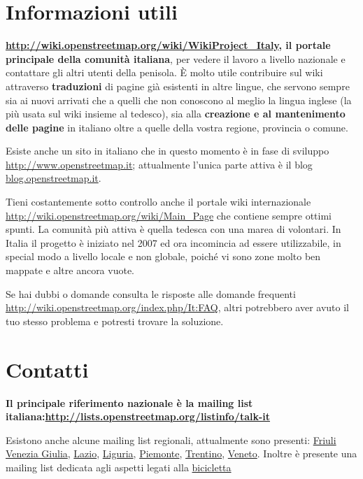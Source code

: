\documentclass[a4paper,twoside,12pt,]{article}
\begin{document}
\section{Informazioni utili}
\textbf{\url{http://wiki.openstreetmap.org/wiki/WikiProject_Italy}, il portale principale della comunità italiana}, per vedere il lavoro a livello nazionale e contattare gli altri utenti della penisola. È molto utile contribuire sul wiki attraverso \textbf{traduzioni} di pagine già esistenti in altre lingue, che servono sempre sia ai nuovi arrivati che a quelli che non conoscono al meglio la lingua inglese (la più usata sul wiki insieme al tedesco), sia alla \textbf{creazione e al mantenimento delle pagine} in italiano oltre a quelle della vostra regione, provincia o comune.

Esiste anche un sito in italiano che in questo momento è in fase di sviluppo \url{http://www.openstreetmap.it}; attualmente l'unica parte attiva è il blog \url{blog.openstreetmap.it}.

Tieni costantemente sotto controllo anche il portale wiki internazionale \url{http://wiki.openstreetmap.org/wiki/Main_Page} che contiene sempre ottimi spunti.  La comunità più attiva è quella tedesca con una marea di volontari. In Italia il progetto è iniziato nel 2007 ed ora incomincia ad essere utilizzabile, in special modo a livello locale e non globale, poiché vi sono zone molto ben mappate e altre ancora vuote.

Se hai dubbi o domande consulta le risposte alle domande frequenti \url{http://wiki.openstreetmap.org/index.php/It:FAQ}, altri potrebbero aver avuto il tuo stesso problema e potresti trovare la soluzione.
\section{Contatti}
\textbf{Il principale riferimento nazionale è la mailing list italiana:\newline \url{http://lists.openstreetmap.org/listinfo/talk-it}}

Esistono anche alcune mailing list regionali, attualmente sono presenti: \href{http://lists.openstreetmap.org/listinfo/talk-it-fvg}{Friuli Venezia Giulia}, \href{http://lists.openstreetmap.org/listinfo/talk-it-lazio}{Lazio}, \href{http://lists.openstreetmap.org/listinfo/talk-it-liguria}{Liguria}, \href{http://lists.openstreetmap.org/listinfo/talk-it-piemonte}{Piemonte}, \href{http://lists.openstreetmap.org/listinfo/talk-it-trentino}{Trentino}, \href{http://liste.remixtj.net/listinfo/osmveneto}{Veneto}. Inoltre è presente una mailing list dedicata agli aspetti legati alla \href{http://lists.openstreetmap.org/listinfo/talk-it-bici}{bicicletta}
\end{document}
